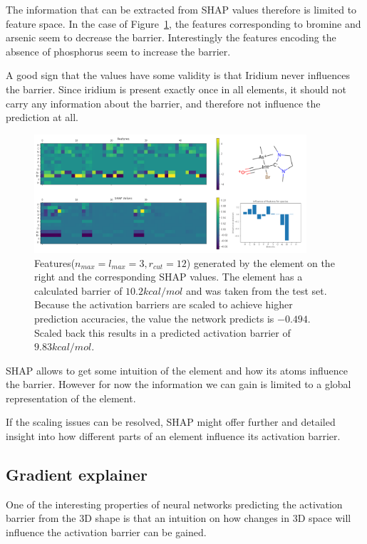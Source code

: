 The information that can be extracted from SHAP values therefore is limited to feature space.
In the case of Figure~\ref{fig:shap}, the features corresponding to bromine and arsenic seem to decrease the barrier.
Interestingly the features encoding the absence of phosphorus seem to increase the barrier.

A good sign that the values have some validity is that Iridium never influences the barrier.
Since iridium is present exactly once in all elements, it should not carry any information about the barrier,
and therefore not influence the prediction at all.

\begin{figure}[H]
    \centering
    \includegraphics[width=0.9\textwidth]{figures/evaluation/SHAP.png}
    \caption[SHAP values]{
        Features($n_{max}=l_{max}=3, r_{cut}=12$) generated by the element on the right and the corresponding SHAP values.
        The element has a calculated barrier of $10.2 kcal/mol$ and was taken from the test set.
        Because the activation barriers are scaled to achieve higher prediction accuracies,
        the value the network predicts is $-0.494$. Scaled back this results in a predicted activation 
        barrier of $9.83 kcal/mol$.
     }
    \label{fig:shap}
  \end{figure}

SHAP allows to get some intuition of the element and how its atoms influence the barrier.
However for now the information we can gain is limited to a global representation of the element.

If the scaling issues can be resolved, SHAP might offer further and detailed insight into how different parts of an element influence its activation barrier.

\subsection{Gradient explainer}

One of the interesting properties of neural networks predicting the activation barrier from the 3D shape is 
that an intuition on how changes in 3D space will influence the activation barrier can be gained.

